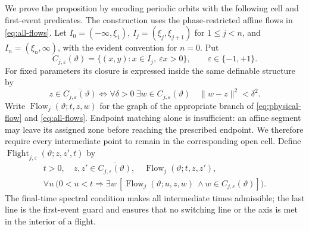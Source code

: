 \documentclass[11pt]{article}
\theoremstyle{remark}
\begin{document}
We prove the proposition by encoding periodic orbits with the following
cell and first-event predicates.  The construction uses the
phase-restricted affine flows in \eqref{eq:all-flows}.
Let \(I_0=(-\infty,\xi_1)\),
\(I_j=(\xi_j,\xi_{j+1})\) for \(1\le j<n\), and
\(I_n=(\xi_n,\infty)\), with the evident convention for \(n=0\).  Put
\[
 C_{j,\varepsilon}(\vartheta)=
 \{(x,y):x\in I_j,\ \varepsilon x>0\},
 \qquad \varepsilon\in\{-1,+1\}.
\]
For fixed parameters its closure is expressed inside the same definable
structure by
\[
 z\in\overline{C_{j,\varepsilon}(\vartheta)}
 \Longleftrightarrow
 \forall\delta>0\ \exists w\in C_{j,\varepsilon}(\vartheta)
 \quad\|w-z\|^2<\delta^2.
\]
Write \(\operatorname{Flow}_j(\vartheta;t,z,w)\) for the graph of the
appropriate branch of \eqref{eq:physical-flow} and \eqref{eq:all-flows}.
Endpoint matching alone is insufficient: an affine segment may leave
its assigned zone before reaching the prescribed endpoint.  We therefore
require every intermediate point to remain in the corresponding open cell.
Define \(\operatorname{Flight}_{j,\varepsilon}(\vartheta;z,z',t)\) by
\begin{equation}\label{eq:flight-predicate}
\begin{gathered}
t>0,\quad z,z'\in\overline{C_{j,\varepsilon}(\vartheta)},\quad
\operatorname{Flow}_j(\vartheta;t,z,z'),\\
\forall u\ \bigl(0<u<t\Longrightarrow
 \exists w\,[\operatorname{Flow}_j(\vartheta;u,z,w)\ \wedge
 w\in C_{j,\varepsilon}(\vartheta)]\bigr).
\end{gathered}
\end{equation}
The final-time spectral condition makes all intermediate times admissible;
the last line is the first-event guard and ensures that no switching line
or the axis is met in the interior of a flight.
\end{document}

